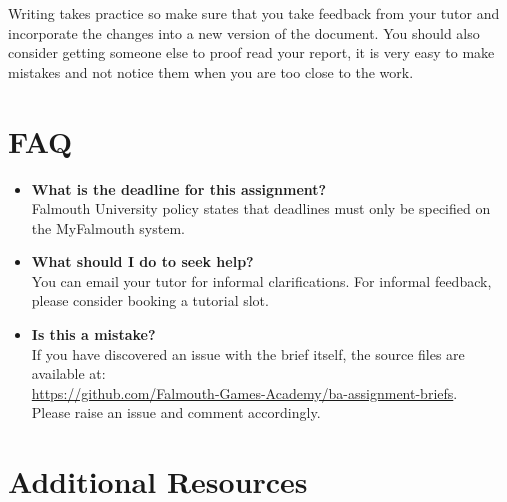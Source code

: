 \documentclass{../../fal_assignment}
\begin{document}
	Writing takes practice so make sure that you take feedback from your tutor and incorporate the changes into a new version of the document. You should also consider getting someone else to proof read your report, it is very easy to make mistakes and not notice them when you are too close to the work.
	
	\section*{FAQ}
	
	\begin{itemize}
		\item 	\textbf{What is the deadline for this assignment?} \\ 
		Falmouth University policy states that deadlines must only be specified on the MyFalmouth system.
		
		\item 	\textbf{What should I do to seek help?} \\ 
		You can email your tutor for informal clarifications. For informal feedback, please consider booking a tutorial slot.
		
		\item 	\textbf{Is this a mistake?} \\ 	
		If you have discovered an issue with the brief itself, the source files are available at: \\
		\url{https://github.com/Falmouth-Games-Academy/ba-assignment-briefs}.\\
		Please raise an issue and comment accordingly.
	\end{itemize}
	
	\section*{Additional Resources}
	
\end{document}
